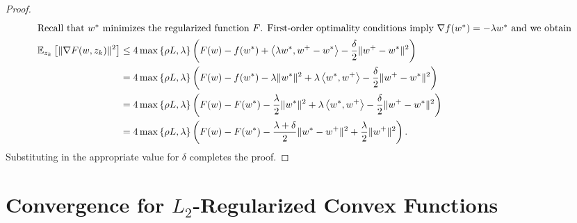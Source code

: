 \begin{proof}
\begin{align*}
       \intertext{Recall that \( w^*\) minimizes the regularized function \( F \). First-order optimality conditions imply \( \nabla f(w^*) = - \lambda w^*\) and we obtain} 
       \mathbb{E}_{z_{k}}\left[\|\nabla F(w, z_{k})\|^2\right] &\leq 4 \max\left\{\rho L, \lambda\right\} \left(F(w) - f(w^*) + \left\langle\lambda w^*, w^+ - w^*\right\rangle - \frac{\delta}{2}\|w^+ - w^*\|^2 \right)\\
                                                     &= 4 \max\left\{\rho L, \lambda\right\} \left(F(w) - f(w^*) - \lambda \|w^*\|^2  + \lambda \left\langle w^*, w^+\right\rangle - \frac{\delta}{2}\|w^+ - w^*\|^2\right)\\
                                                     &=  4 \max\left\{\rho L, \lambda\right\} \left(F(w) - F(w^*) - \frac{\lambda}{2} \|w^*\|^2 + \lambda \left\langle w^*, w^+\right\rangle - \frac{\delta}{2}\|w^+ - w^*\|^2\right)\\
                                                     &= 4 \max\left\{\rho L, \lambda\right\} \left(F(w) - F(w^*) - \frac{\lambda + \delta}{2} \|w^* - w^+\|^2 + \frac{\lambda}{2} \|w^+\|^2\right).
   \end{align*} 
   Substituting in the appropriate value for \( \delta \) completes the proof.
\end{proof}

\newpage

\section{Convergence for \( L_2 \)-Regularized Convex Functions}~\label{app:regularized-convex}

